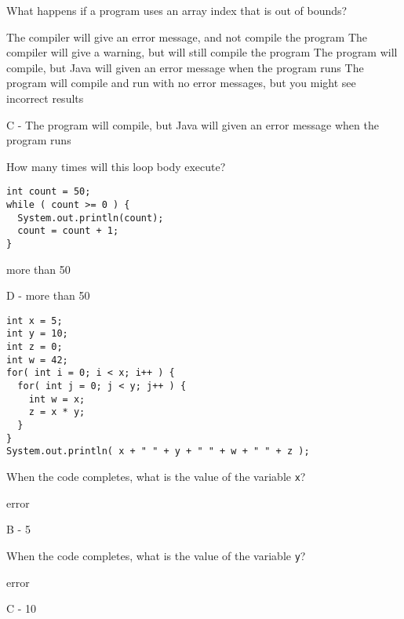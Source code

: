\documentclass[11pt,answers]{exam}
\begin{document}
\begin{questions}
\question[1] What happens if a program uses an array index that is out of bounds?
\begin{choices}
	\choice The compiler will give an error message, and not compile the program
	\choice The compiler will give a warning, but will still compile the program
	\choice The program will compile, but Java will given an error message when the program runs
	\choice The program will compile and run with no error messages, but you might see incorrect results
\end{choices}
\begin{solution}
	C - The program will compile, but Java will given an error message when the program runs
\end{solution}

\newpage

\question[1] How many times will this loop body execute? \newline
\begin{lstlisting}
int count = 50; 
while ( count >= 0 ) {
  System.out.println(count);
  count = count + 1;
}	
\end{lstlisting} 
\begin{oneparchoices}
	    \choice more than 50
\end{oneparchoices}
\begin{solution}
	D - more than 50 
\end{solution}

\begin{lstlisting}
int x = 5;
int y = 10;
int z = 0;
int w = 42;
for( int i = 0; i < x; i++ ) {
  for( int j = 0; j < y; j++ ) {
    int w = x;
    z = x * y;	
  }
}	
System.out.println( x + " " + y + " " + w + " " + z );
\end{lstlisting}

\question[1] When the code completes, what is the value of the variable {\tt x}? \newline
\begin{oneparchoices}
	    \choice error
\end{oneparchoices}
\begin{solution}
	B - 5
\end{solution}

\question[1] When the code completes, what is the value of the variable {\tt y}? \newline
\begin{oneparchoices}
	    \choice error
\end{oneparchoices}
\begin{solution}
	C - 10
\end{solution}


\end{questions}
\end{document}
